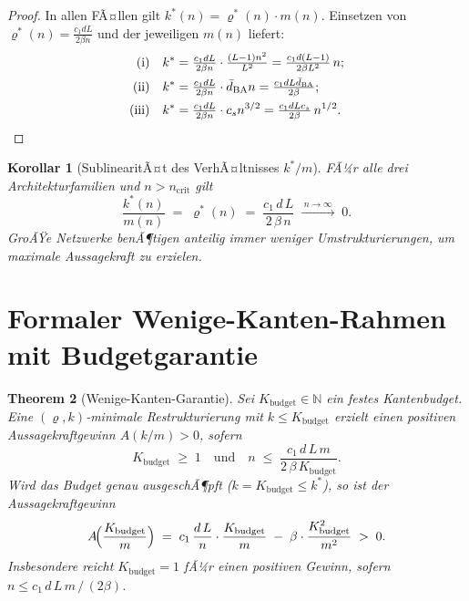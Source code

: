 ﻿\documentclass[12pt, a4paper, openany]{report}
\newtheorem{theorem}{Theorem}[chapter]
\newtheorem{corollary}[theorem]{Korollar}
\newcommand{\N}{\mathbb{N}}
\begin{document}
\begin{proof}
In allen FÃ¤llen gilt $k^*(n) = \varrho^*(n)\cdot m(n)$.  Einsetzen von
$\varrho^*(n) = \frac{c_1 dL}{2\beta n}$ und der jeweiligen $m(n)$ liefert:
\begin{align*}
  \text{(i)} &\quad k^* = \tfrac{c_1 dL}{2\beta n}\cdot\tfrac{(L-1)n^2}{L^2}
                = \tfrac{c_1 d(L-1)}{2\beta L^2}\,n; \\
  \text{(ii)}&\quad k^* = \tfrac{c_1 dL}{2\beta n}\cdot\bar{d}_{\mathrm{BA}} n
                = \tfrac{c_1 dL\bar{d}_{\mathrm{BA}}}{2\beta}; \\
  \text{(iii)}&\quad k^* = \tfrac{c_1 dL}{2\beta n}\cdot c_s n^{3/2}
                = \tfrac{c_1 dLc_s}{2\beta}\,n^{1/2}. \qedhere
\end{align*}
\end{proof}

\begin{corollary}[SublinearitÃ¤t des VerhÃ¤ltnisses $k^*/m$]
\label{cor:k_over_m}
FÃ¼r alle drei Architekturfamilien und $n > n_{\mathrm{crit}}$ gilt
\[
  \frac{k^*(n)}{m(n)} \;=\; \varrho^*(n) \;=\;
  \frac{c_1\,d\,L}{2\,\beta\,n}
  \;\xrightarrow{\;n\to\infty\;}\; 0.
\]
GroÃŸe Netzwerke benÃ¶tigen \emph{anteilig immer weniger Umstrukturierungen},
um maximale Aussagekraft zu erzielen.
\end{corollary}

\section{Formaler Wenige-Kanten-Rahmen mit Budgetgarantie}
\label{sec:scaling_budget}

\begin{theorem}[Wenige-Kanten-Garantie]
\label{thm:few_edges_guarantee}
Sei $K_{\mathrm{budget}} \in \N$ ein festes Kantenbudget.  Eine
$(\varrho, k)$-minimale Restrukturierung mit $k \leq K_{\mathrm{budget}}$
erzielt einen positiven Aussagekraftgewinn $A(k/m) > 0$, sofern
\begin{equation}
  \label{eq:budget_condition}
  K_{\mathrm{budget}} \;\geq\; 1
  \quad\text{und}\quad
  n \;\leq\; \frac{c_1\,d\,L\,m}{2\,\beta\,K_{\mathrm{budget}}}.
\end{equation}
Wird das Budget genau ausgeschÃ¶pft ($k = K_{\mathrm{budget}} \leq k^*$), so ist
der Aussagekraftgewinn
\begin{equation}
  \label{eq:A_budget}
  A\!\Bigl(\frac{K_{\mathrm{budget}}}{m}\Bigr)
  \;=\; c_1\,\frac{d\,L}{n}\cdot\frac{K_{\mathrm{budget}}}{m}
  \;-\; \beta\cdot\frac{K_{\mathrm{budget}}^2}{m^2}
  \;>\; 0.
\end{equation}
Insbesondere reicht $K_{\mathrm{budget}} = 1$ fÃ¼r einen positiven Gewinn,
sofern $n \leq c_1\,d\,L\,m\,/\,(2\beta)$.
\end{theorem}
\end{document}
